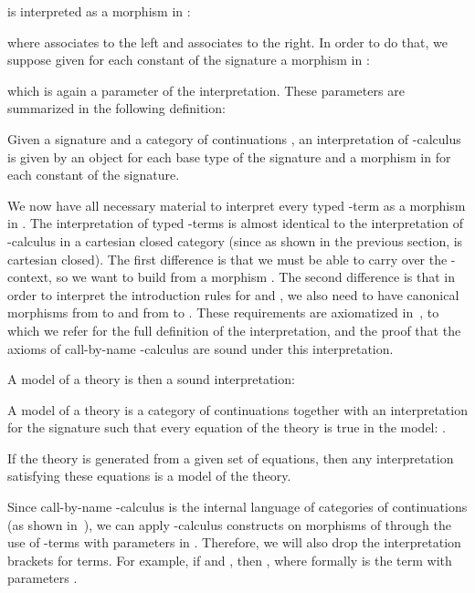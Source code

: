\documentclass{CSML}
\begin{document}
is interpreted as a morphism in :

where  associates to the left and  associates to the right. In order to do that, we suppose given for each constant  of the signature a morphism in :

which is again a parameter of the interpretation. These parameters are summarized in the following definition:
\begin{defi}[Interpretation]
Given a signature and a category of continuations , an interpretation of -calculus is given by an object  for each base type  of the signature and a morphism  in  for each constant  of the signature.
\end{defi}
We now have all necessary material to interpret every typed -term as a morphism in . The interpretation of typed -terms is almost identical to the interpretation of -calculus in a cartesian closed category (since as shown in the previous section,  is cartesian closed). The first difference is that we must be able to carry over the -context, so we want to build from  a morphism . The second difference is that in order to interpret the introduction rules for  and , we also need to have canonical morphisms from  to  and from  to . These requirements are axiomatized in~\cite{SelingerControl}, to which we refer for the full definition of the interpretation, and the proof that the axioms of call-by-name -calculus are sound under this interpretation.\par
A model of a  theory is then a sound interpretation:
\begin{defi}
\label{LambdaMuModel}
A model of a  theory is a category of continuations together with an interpretation for the  signature such that every equation  of the theory is true in the model: .
\end{defi}
If the  theory is generated from a given set of equations, then any interpretation satisfying these equations is a model of the  theory.\par
Since call-by-name -calculus is the internal language of categories of continuations (as shown in~\cite{SelingerControl}), we can apply -calculus constructs on morphisms of  through the use of -terms with parameters in . Therefore, we will also drop the interpretation brackets for terms. For example, if  and , then , where formally  is the term with parameters .
\end{document}
